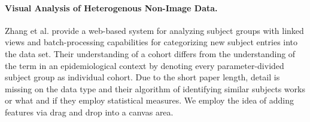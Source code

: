 \documentclass[journal]{style/vgtc} 			          %
\newcommand{\add}[1]{\textcolor{blue}{\uline{#1}}}
\begin{document}
\paragraph{Visual Analysis of Heterogenous Non-Image Data.}
Zhang et al. \cite{Zhang2012} provide a web-based system for analyzing subject groups with linked views and batch-processing capabilities for categorizing new subject entries into the data set.
%
Their understanding of a cohort differs from the understanding of the term in an epidemiological context by denoting every parameter-divided subject group as individual cohort.
%
Due to the short paper length, detail is missing on the data type and their algorithm of identifying similar subjects works or what and if they employ statistical measures.
%
We employ the idea of adding features via drag and drop into a canvas area.
\end{document}
